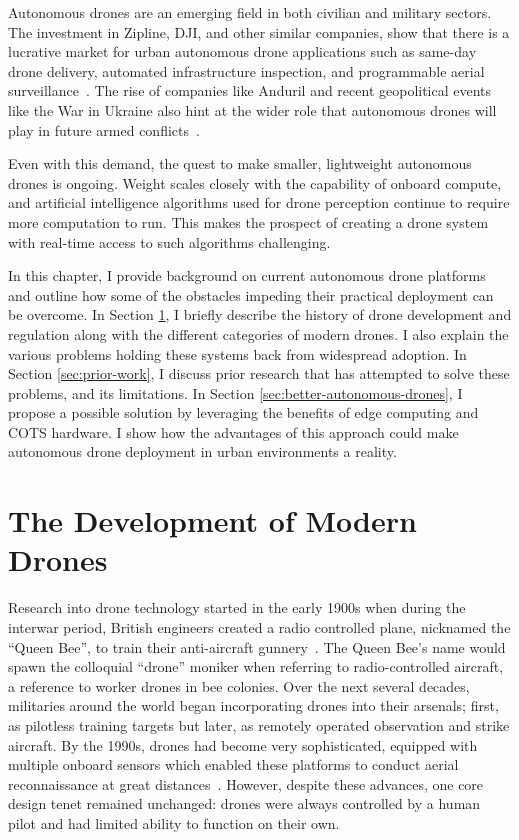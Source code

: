 Autonomous drones are an emerging field in both civilian and military sectors. The investment in Zipline, DJI, and other similar companies, show that there is a lucrative market for urban autonomous drone applications such as same-day drone delivery, automated infrastructure inspection, and programmable aerial surveillance~\cite{GrandviewResearchDroneMarket,ForbesZiplineEvaluation}. The rise of companies like Anduril and recent geopolitical events like the War in Ukraine also hint at the wider role that autonomous drones will play in future armed conflicts~\cite{CNBC,CFAS}.

Even with this demand, the quest to make smaller, lightweight autonomous drones is ongoing. Weight scales closely with the capability of onboard compute, and artificial intelligence algorithms used for drone perception continue to require more computation to run. This makes the prospect of creating a drone system with real-time access to such algorithms challenging.

In this chapter, I provide background on current autonomous drone platforms and outline how some of the obstacles impeding their practical deployment can be overcome. In Section \ref{sec:history-drone-development}, I briefly describe the history of drone development and regulation along with the different categories of modern drones. I also explain the various problems holding these systems back from widespread adoption. In Section \ref{sec:prior-work}, I discuss prior research that has attempted to solve these problems, and its limitations. In Section \ref{sec:better-autonomous-drones}, I propose a possible solution by leveraging the benefits of edge computing and COTS hardware. I show how the advantages of this approach could make autonomous drone deployment in urban environments a reality.

\section{The Development of Modern Drones}
\label{sec:history-drone-development}

Research into drone technology started in the early 1900s when during the interwar period, British engineers created a radio controlled plane, nicknamed the ``Queen Bee'', to train their anti-aircraft gunnery~\cite{IWMDrone}. The Queen Bee's name would spawn the colloquial ``drone'' moniker when referring to radio-controlled aircraft, a reference to worker drones in bee colonies. Over the next several decades, militaries around the world began incorporating drones into their arsenals; first, as pilotless training targets but later, as remotely operated observation and strike aircraft. By the 1990s, drones had become very sophisticated, equipped with multiple onboard sensors which enabled these platforms to conduct aerial reconnaissance at great distances~\cite{GlobalHawk}. However, despite these advances, one core design tenet remained unchanged: drones were always controlled by a human pilot and had limited ability to function on their own.

